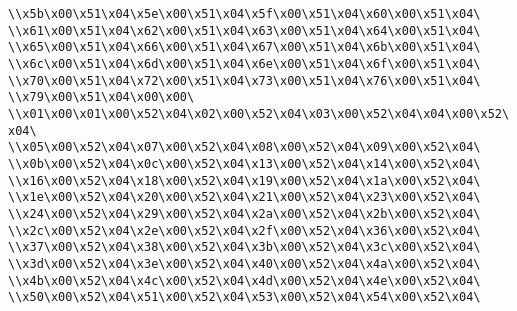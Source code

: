 \verb|\\x5b\x00\x51\x04\x5e\x00\x51\x04\x5f\x00\x51\x04\x60\x00\x51\x04\|\newline
\verb|\\x61\x00\x51\x04\x62\x00\x51\x04\x63\x00\x51\x04\x64\x00\x51\x04\|\newline
\verb|\\x65\x00\x51\x04\x66\x00\x51\x04\x67\x00\x51\x04\x6b\x00\x51\x04\|\newline
\verb|\\x6c\x00\x51\x04\x6d\x00\x51\x04\x6e\x00\x51\x04\x6f\x00\x51\x04\|\newline
\verb|\\x70\x00\x51\x04\x72\x00\x51\x04\x73\x00\x51\x04\x76\x00\x51\x04\|\newline
\verb|\\x79\x00\x51\x04\x00\x00\|\newline
\verb|\\x01\x00\x01\x00\x52\x04\x02\x00\x52\x04\x03\x00\x52\x04\x04\x00\x52\x04\|\newline
\verb|\\x05\x00\x52\x04\x07\x00\x52\x04\x08\x00\x52\x04\x09\x00\x52\x04\|\newline
\verb|\\x0b\x00\x52\x04\x0c\x00\x52\x04\x13\x00\x52\x04\x14\x00\x52\x04\|\newline
\verb|\\x16\x00\x52\x04\x18\x00\x52\x04\x19\x00\x52\x04\x1a\x00\x52\x04\|\newline
\verb|\\x1e\x00\x52\x04\x20\x00\x52\x04\x21\x00\x52\x04\x23\x00\x52\x04\|\newline
\verb|\\x24\x00\x52\x04\x29\x00\x52\x04\x2a\x00\x52\x04\x2b\x00\x52\x04\|\newline
\verb|\\x2c\x00\x52\x04\x2e\x00\x52\x04\x2f\x00\x52\x04\x36\x00\x52\x04\|\newline
\verb|\\x37\x00\x52\x04\x38\x00\x52\x04\x3b\x00\x52\x04\x3c\x00\x52\x04\|\newline
\verb|\\x3d\x00\x52\x04\x3e\x00\x52\x04\x40\x00\x52\x04\x4a\x00\x52\x04\|\newline
\verb|\\x4b\x00\x52\x04\x4c\x00\x52\x04\x4d\x00\x52\x04\x4e\x00\x52\x04\|\newline
\verb|\\x50\x00\x52\x04\x51\x00\x52\x04\x53\x00\x52\x04\x54\x00\x52\x04\|\newline
